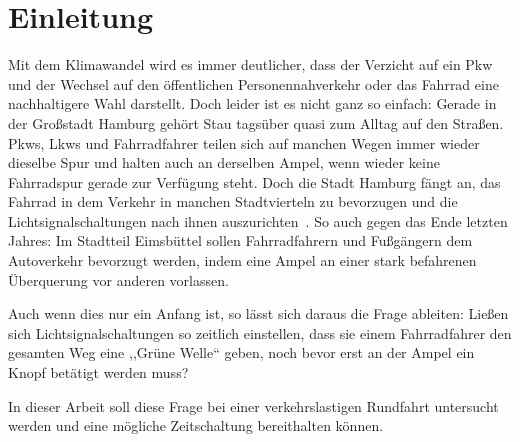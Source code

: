 %
\chapter{Einleitung}\label{ch:einleitung}

Mit dem Klimawandel wird es immer deutlicher, dass der Verzicht auf ein Pkw und der Wechsel auf den öffentlichen Personennahverkehr oder das Fahrrad eine nachhaltigere Wahl darstellt.
Doch leider ist es nicht ganz so einfach: Gerade in der Großstadt Hamburg gehört Stau tagsüber quasi zum Alltag auf den Straßen.
Pkws, Lkws und Fahrradfahrer teilen sich auf manchen Wegen immer wieder dieselbe Spur und halten auch an derselben Ampel, wenn wieder keine Fahrradspur gerade zur Verfügung steht.
Doch die Stadt Hamburg fängt an, das Fahrrad in dem Verkehr in manchen Stadtvierteln zu bevorzugen und die Lichtsignalschaltungen nach ihnen auszurichten~\cite{NDR2022}.
So auch gegen das Ende letzten Jahres: Im Stadtteil Eimsbüttel sollen Fahrradfahrern und Fußgängern dem Autoverkehr bevorzugt werden, indem eine Ampel an einer stark befahrenen Überquerung vor anderen vorlassen.

Auch wenn dies nur ein Anfang ist, so lässt sich daraus die Frage ableiten: Ließen sich Lichtsignalschaltungen so zeitlich einstellen, dass sie einem Fahrradfahrer den gesamten Weg eine ,,Grüne Welle`` geben, noch bevor erst an der Ampel ein Knopf betätigt werden muss?

In dieser Arbeit soll diese Frage bei einer verkehrslastigen Rundfahrt untersucht werden und eine mögliche Zeitschaltung bereithalten können.




